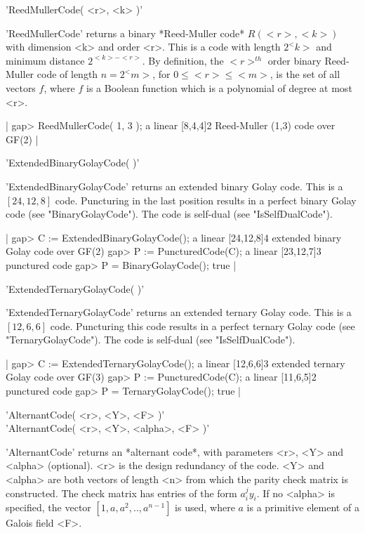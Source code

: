 'ReedMullerCode( <r>, <k> )'

'ReedMullerCode' returns a binary  *Reed-Muller code* $R(<r>, <k>)$  with
dimension <k>  and  order <r>.  This  is a code  with  length $2^<k>$ and
minimum  distance  $2^{<k>-<r>}$. By   definition, the  $<r>^{th}$  order
binary Reed-Muller  code of length $n=2^<m>$, for  $0 \leq <r> \leq <m>$,
is the set of all vectors $f$, where $f$ is a Boolean function which is a
polynomial of degree at most <r>.

|    gap> ReedMullerCode( 1, 3 );
    a linear [8,4,4]2 Reed-Muller (1,3) code over GF(2) |
 

'ExtendedBinaryGolayCode( )'

'ExtendedBinaryGolayCode' returns an extended binary  Golay code. This is
a $[24,12,8]$ code. Puncturing in the last  position results in a perfect
binary Golay  code (see "BinaryGolayCode").  The  code is  self-dual (see
"IsSelfDualCode").

|    gap> C := ExtendedBinaryGolayCode();
    a linear [24,12,8]4 extended binary Golay code over GF(2)
    gap> P := PuncturedCode(C);
    a linear [23,12,7]3 punctured code
    gap> P = BinaryGolayCode();
    true |


'ExtendedTernaryGolayCode( )'

'ExtendedTernaryGolayCode' returns an  extended ternary Golay  code. This
is a $[12,6,6]$ code. Puncturing  this code results  in a perfect ternary
Golay   code (see  "TernaryGolayCode").  The     code is self-dual   (see
"IsSelfDualCode").

|    gap> C := ExtendedTernaryGolayCode();
    a linear [12,6,6]3 extended ternary Golay code over GF(3)
    gap> P := PuncturedCode(C);
    a linear [11,6,5]2 punctured code
    gap> P = TernaryGolayCode();
    true |


'AlternantCode( <r>, <Y>, <F> )'\\
'AlternantCode( <r>, <Y>, <alpha>, <F> )'

'AlternantCode' returns an *alternant code*, with parameters <r>, <Y> and
<alpha> (optional).  <r> is the  design redundancy of   the code. <Y> and
<alpha> are both vectors of length <n> from which the parity check matrix
is constructed. The check matrix has entries of the form $a_i^j y_i$.  If
no <alpha> is specified, the  vector $[1, a,  a^2, .., a^{n-1}]$ is used,
where $a$ is a primitive element of a Galois field <F>.

